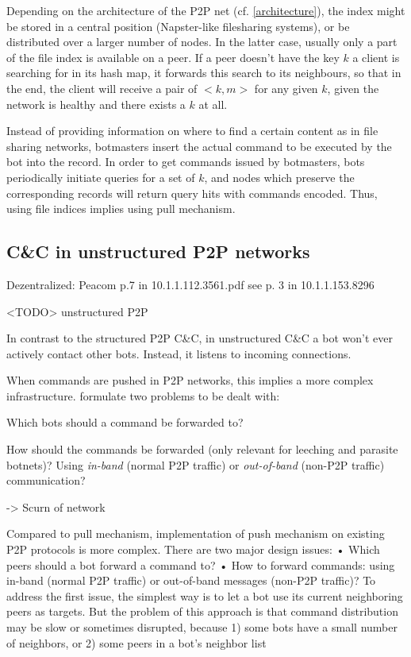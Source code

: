 \documentclass{llncs}
\begin{document}
Depending on the architecture of the P2P net (cf. \ref{architecture}),
the index might be stored in a central position (Napster-like
filesharing systems), or be distributed over a larger number of
nodes.  In the latter case, usually only a part
of the file index is available on a peer. If a peer doesn't have the
key $k$ a client is searching for in its hash map, it forwards this
search to its neighbours, so that in the end, the client will receive
a pair of $<k, m>$ for any given $k$, given the network is healthy and
there exists a $k$ at all.

Instead of providing information on where to find a certain content as
in file sharing networks, botmasters insert the actual command to be
executed by the bot into the record.  In order to get commands issued
by botmasters, bots periodically initiate queries for a set of $k$,
and nodes which preserve the corresponding records will return query
hits with commands encoded. Thus, using file indices implies using
pull mechanism. \cite{liang2006index}

\subsection{C\&C in unstructured P2P networks}
Dezentralized: Peacom p.7 in 10.1.1.112.3561.pdf
see p. 3 in 10.1.1.153.8296

<TODO> unstructured P2P 

In contrast to the structured P2P C\&C, in unstructured C\&C a bot
won't ever actively contact other bots. Instead, it listens to
incoming connections.  \cite{liang2006index}


When commands are pushed in P2P networks, this implies a more complex infrastructure. \cite{li2009botnet} formulate two problems to be dealt with:
\begin{list}
\item Which bots should a command be forwarded to?
\item How should the commands be forwarded (only relevant for leeching
  and parasite botnets)? Using {\it in-band} (normal P2P traffic) or
  {\it out-of-band} (non-P2P traffic) communication?
\end{list}

-> Scurn of network

Compared to pull mechanism, implementation of push
mechanism on existing P2P protocols is more complex. There
are two major design issues:
• Which peers should a bot forward a command to?
• How to forward commands: using in-band (normal P2P
traffic) or out-of-band messages (non-P2P traffic)?
To address the first issue, the simplest way is to let a bot
use its current neighboring peers as targets. But the problem
of this approach is that command distribution may be slow
or sometimes disrupted, because 1) some bots have a small
number of neighbors, or 2) some peers in a bot’s neighbor list
\end{document}
